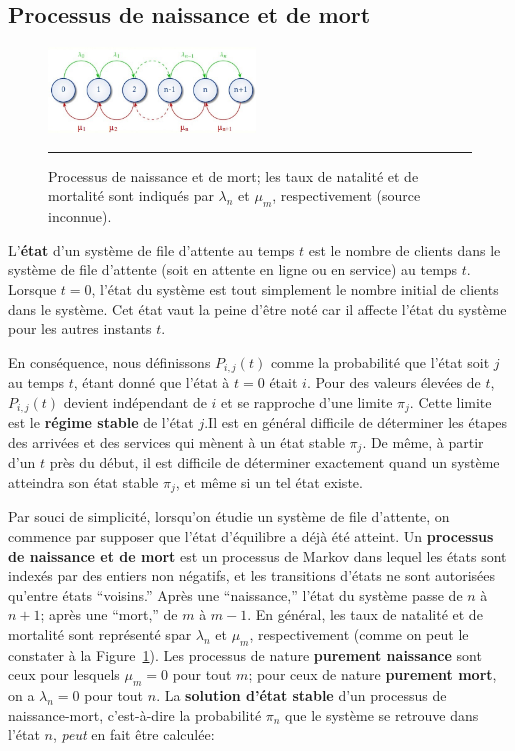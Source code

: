 \subsection{Processus de naissance et de mort}
\begin{figure}[!t]
	\centering
		\includegraphics[width=0.49\textwidth]{Images/fig2Queue.jpg}
	\caption{\small Processus de naissance et de mort; les taux de natalité et de mortalité sont indiqués par $\lambda_n$ et $\mu_m$, respectivement (source inconnue).}
	\label{fig:2}\hrule
\end{figure}
L'\textbf{état} d'un système de file d’attente au temps $t$ est le nombre de clients dans le système de file d’attente (soit en attente en ligne ou en service) au temps $t$. Lorsque $t = 0$, l'état du système est tout simplement le nombre initial de clients dans le système.  Cet état vaut la peine d'être noté car il affecte l'état du système pour les autres instants $t$.  \par En conséquence, nous définissons $P_{i,j} (t)$ comme la probabilité que l'état soit $j$ au temps $t$, étant donné que l'état à $t = 0$ était $i$. Pour des valeurs élevées de $t$, $P_{i,j} (t)$ devient indépendant de $i$ et se rapproche d'une limite $\pi_{j}$. Cette limite est le \textbf{régime stable} de l’état $j$.\newl Il est en général difficile de déterminer les étapes des arrivées et des services qui mènent à un état stable $\pi_j$. De même, à partir d'un $t$ près du début, il est difficile de déterminer exactement quand un système atteindra son état stable $\pi_j$, et même si un tel état existe. \par Par souci de simplicité, lorsqu'on étudie un système de file d'attente, on commence par supposer que l'état d'équilibre a déjà été atteint.\newl  
Un \textbf{processus de naissance et de mort} est un processus de Markov dans lequel les états sont indexés par des entiers non négatifs, et les transitions d’états ne sont autorisées qu'entre états ``voisins.'' Après une ``naissance,'' l'état du système passe de $n$ à $n+1$; après une ``mort,'' de $m$ à $m-1$. En général, les taux de natalité et de mortalité sont représenté spar $\lambda_n$ et $\mu_m$, respectivement (comme on peut le constater à la Figure~\ref{fig:2}). Les processus de nature  \textbf{purement naissance} sont ceux pour lesquels $\mu_m=0$ pour tout $m$; pour ceux de nature \textbf{purement mort}, on a $\lambda_n=0$ pour tout $n$. La \textbf{solution d'état stable} d'un processus de naissance-mort, c'est-à-dire la probabilité $\pi_n$ que le système se retrouve dans l'état $n$, \textit{peut} en fait être calculée: 
